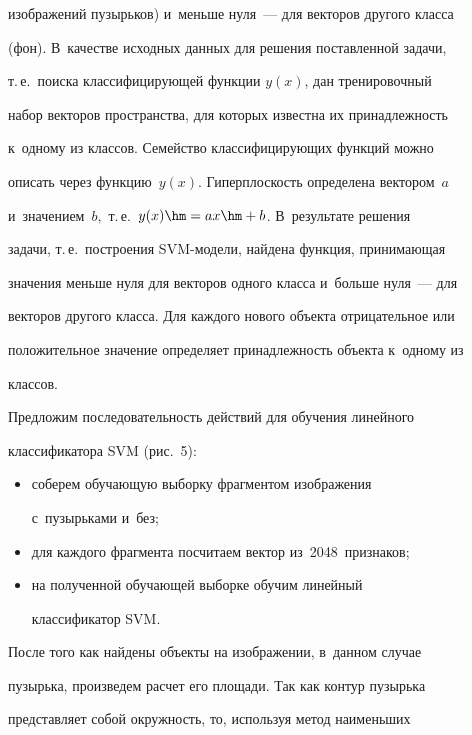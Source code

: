 изображений пузырьков) и~меньше нуля~--- для векторов другого класса 


(фон). В~качестве исходных данных для решения поставленной задачи, 


т.\,е.\ поиска классифицирующей функции $y(x)$, дан тренировочный 


набор векторов пространства, для которых известна их принадлежность 


к~одному из классов. Семейство классифицирующих функций можно 


описать через функцию~$y(x)$. Гиперплоскость определена вектором~$a$ 


и~значением~$b,$ т.\,е.\ $y(x)\hm=ax \hm+ b$. В~результате решения 


задачи, т.\,е.\ построения SVM-мо\-де\-ли, найдена функция, принимающая 


значения меньше нуля для векторов одного класса и~больше нуля~--- для 


векторов другого класса. Для каждого нового объекта отрицательное или 


положительное значение определяет принадлежность объекта к~одному из 


классов.


   


   Предложим последовательность действий для обучения линейного 


классификатора SVM (рис.~5):


\begin{itemize}


\item соберем обучающую выборку фрагментом изображения 


с~пузырьками и~без;


\item для каждого фрагмента посчитаем вектор из~2048~признаков;


\item на полученной обучающей выборке обучим линейный 


классификатор SVM.


   \end{itemize}


   


   После того как найдены объекты на изображении, в~данном случае 


пузырька, произведем расчет его площади. Так как контур пузырька 


представляет собой окружность, то, используя метод наименьших 


